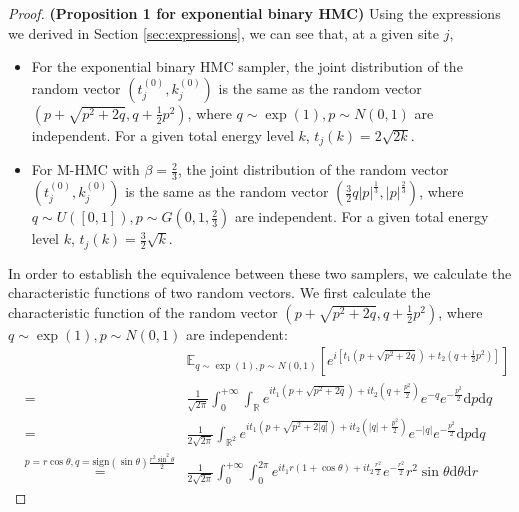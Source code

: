 \documentclass{article}
\begin{document}
\begin{proof}\textbf{(Proposition 1 for exponential binary HMC)}
Using the expressions we derived in Section \ref{sec:expressions}, we can see that, at a given site $j$,
\begin{itemize}
  \item For the exponential binary HMC sampler, the joint distribution of the
  random vector $(t_j^{(0)}, k_j^{(0)})$ is the same as the random vector
  $\left( p + \sqrt{p^2 + 2 q}, q + \frac{1}{2} p^2 \right)$, where $q \sim
  \exp (1), p \sim N (0, 1)$ are independent. For a given total energy level
  $k$, $t_j (k) = 2 \sqrt{2 k}$.
  
  \item For M-HMC with $\beta = \frac{2}{3}$, the joint
  distribution of the random vector $(t_j^{(0)}, k_j^{(0)})$ is the same as
  the random vector $\left( \frac{3}{2} q | p |^{\frac{1}{3}}, | p
  |^{\frac{2}{3}} \right)$, where $q \sim U ([0, 1]), p \sim G \left( 0, 1,
  \frac{2}{3} \right)$ are independent. For a given total energy level $k$,
  $t_j (k) = \frac{3}{2} \sqrt{k}$.
\end{itemize}
In order to establish the equivalence between these two samplers, we calculate the characteristic functions of two random vectors. We first calculate the characteristic function of the random vector $\left( p + \sqrt{p^2 + 2 q}, q + \frac{1}{2} p^2 \right)$, where $q \sim \exp (1), p \sim N (0, 1)$ are independent:
  \begin{eqnarray*}
    &  & \mathbb{E}_{q \sim \exp (1), p \sim N (0, 1)} \left[ e^{i \left[ t_1
    \left( p + \sqrt{p^2 + 2 q} \right) + t_2 \left( q + \frac{1}{2} p^2
    \right) \right]} \right]\\
    & = & \frac{1}{\sqrt{2 \pi}} \int_0^{+ \infty} \int_{\mathbb{R}} e^{it_1
    \left( p + \sqrt{p^2 + 2 q} \right) + it_2 \left( q + \frac{p^2}{2}
    \right)} e^{- q} e^{- \frac{p^2}{2}} \mathrm{d} p \mathrm{d} q\\
    & = & \frac{1}{2 \sqrt{2 \pi}} \int_{\mathbb{R}^2} e^{it_1 \left( p +
    \sqrt{p^2 + 2 | q |} \right) + it_2 \left( | q | + \frac{p^2}{2} \right)}
    e^{- | q |} e^{- \frac{p^2}{2}} \mathrm{d} p \mathrm{d} q\\
    & \mathop{=}\limits^{p = r \cos \theta, q = \text{sign} (\sin \theta) \frac{r^2
    \sin^2 \theta}{2}} & \frac{1}{2 \sqrt{2 \pi}} \int_0^{+ \infty} \int_0^{2
    \pi} e^{it_1 r (1 + \cos \theta) + it_2 \frac{r^2}{2}} e^{- \frac{r^2}{2}}
    r^2 \sin \theta \mathrm{d} \theta \mathrm{d} r
  \end{eqnarray*}


\end{proof}
\end{document}
